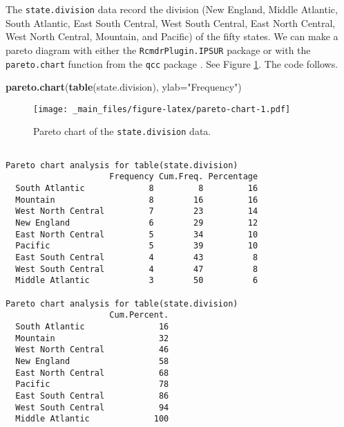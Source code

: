 \documentclass[]{book}
\newenvironment{Shaded}{\begin{snugshade}}{\end{snugshade}}
\newcommand{\KeywordTok}[1]{\textcolor[rgb]{0.13,0.29,0.53}{\textbf{{#1}}}}
\newcommand{\DataTypeTok}[1]{\textcolor[rgb]{0.13,0.29,0.53}{{#1}}}
\newcommand{\StringTok}[1]{\textcolor[rgb]{0.31,0.60,0.02}{{#1}}}
\newcommand{\NormalTok}[1]{{#1}}
\numberwithin{equation}{chapter}
\numberwithin{figure}{chapter}
\theoremstyle{plain}
\theoremstyle{definition}
\theoremstyle{remark}
\theoremstyle{definition}
\theoremstyle{definition}
\theoremstyle{remark}
\let\BeginKnitrBlock\begin \let\EndKnitrBlock\end
\begin{document}
\BeginKnitrBlock{example}[U.S. State Facts and Features]
\protect\hypertarget{ex:unnamed-chunk-49}{}{\label{ex:unnamed-chunk-49}
\iffalse (U.S. State Facts and Features) \fi }The
\texttt{state.division}  data record the division
(New England, Middle Atlantic, South Atlantic, East South Central, West
South Central, East North Central, West North Central, Mountain, and
Pacific) of the fifty states. We can make a pareto diagram with either
the \texttt{RcmdrPlugin.IPSUR}  package
\autocite{RcmdrPlugin.IPSUR} or with the \texttt{pareto.chart}
 function from the
\texttt{qcc}  package \autocite{qcc}. See Figure
\ref{fig:pareto-chart}. The code follows.
\EndKnitrBlock{example}

\begin{Shaded}
\begin{Highlighting}[]
\KeywordTok{pareto.chart}\NormalTok{(}\KeywordTok{table}\NormalTok{(state.division), }\DataTypeTok{ylab=}\StringTok{"Frequency"}\NormalTok{)}
\end{Highlighting}
\end{Shaded}

\begin{figure}[htbp]
\centering
\texttt{[image: \_main\_files/figure-latex/pareto-chart-1.pdf]}
\caption{\label{fig:pareto-chart}\small Pareto chart of the \texttt{state.division}
data.}
\end{figure}

\begin{verbatim}
                    
Pareto chart analysis for table(state.division)
                     Frequency Cum.Freq. Percentage
  South Atlantic             8         8         16
  Mountain                   8        16         16
  West North Central         7        23         14
  New England                6        29         12
  East North Central         5        34         10
  Pacific                    5        39         10
  East South Central         4        43          8
  West South Central         4        47          8
  Middle Atlantic            3        50          6
                    
Pareto chart analysis for table(state.division)
                     Cum.Percent.
  South Atlantic               16
  Mountain                     32
  West North Central           46
  New England                  58
  East North Central           68
  Pacific                      78
  East South Central           86
  West South Central           94
  Middle Atlantic             100
\end{verbatim}
\end{document}
